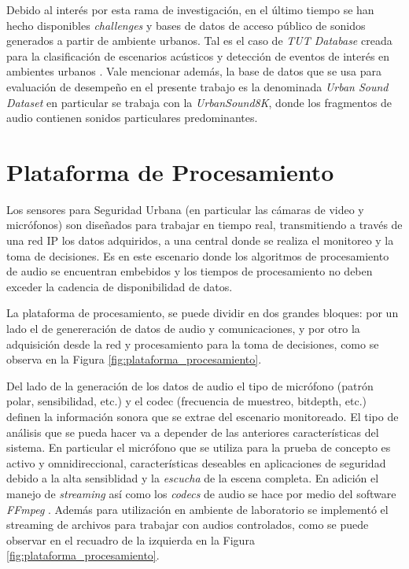 \documentclass{article}
\begin{document}
Debido al interés por esta rama de investigación, en el último tiempo se han hecho disponibles \textit{challenges} y bases de datos de acceso público de sonidos generados a partir de ambiente urbanos. Tal es el caso de \textit{TUT Database} creada para la clasificación de escenarios acústicos y detección de eventos de interés en ambientes urbanos \citep{mesaros2016tut}. Vale mencionar además, la base de datos que se usa para evaluación de desempeño en el presente trabajo es la denominada \textit{Urban Sound Dataset} \citep{Salamon:UrbanSound:ACMMM:14} en particular se trabaja con la \textit{UrbanSound8K}, donde los fragmentos de audio contienen sonidos particulares predominantes. 


\section{Plataforma de Procesamiento}
\label{PP}
Los sensores para Seguridad Urbana (en particular las cámaras de video y micrófonos) son diseñados para trabajar en tiempo real, transmitiendo a través de una red IP los datos adquiridos, a una central donde se realiza el monitoreo y la toma de decisiones. Es en este escenario donde los algoritmos de procesamiento de audio se encuentran embebidos y los tiempos de procesamiento no deben exceder la cadencia de disponibilidad de datos.

\bigskip
La plataforma de procesamiento, se puede dividir en dos grandes bloques: por un lado el de genereración de datos de audio y comunicaciones, y por otro la adquisición desde la red y procesamiento para la toma de decisiones, como se observa en la Figura \ref{fig:plataforma_procesamiento}.
\bigskip

Del lado de la generación de los datos de audio el tipo de micrófono (patrón polar, sensibilidad, etc.) y el codec (frecuencia de muestreo, bitdepth, etc.) definen la información sonora que se extrae del escenario monitoreado. El tipo de análisis que se pueda hacer va a depender de las anteriores características del sistema. En particular el micrófono que se utiliza para la prueba de concepto es activo y omnidireccional, características deseables en aplicaciones de seguridad debido a la alta sensiblidad y la \textit{escucha} de la escena completa. En adición el manejo de \textit{streaming} así como los \textit{codecs} de audio se hace por medio del software \textit{FFmpeg} \citep{bellard2012ffmpeg}. Además para utilización en ambiente de laboratorio se implementó el streaming de archivos para trabajar con audios controlados, como se puede observar en el recuadro de la izquierda en la Figura \ref{fig:plataforma_procesamiento}. 
\bigskip
\end{document}
